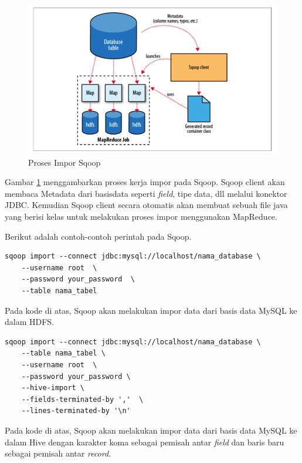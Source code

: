 \begin{figure}
	\centering
	\includegraphics[scale=0.5]{Gambar/sqoop-import.png}
	\caption[Proses Impor Sqoop]{Proses Impor Sqoop \cite{white2012hadoop}} 
	\label{fig:sqoop_import}
\end{figure}

Gambar \ref{fig:sqoop_import} menggambarkan proses kerja impor pada Sqoop. Sqoop client akan membaca Metadata dari basisdata seperti \textit{field}, tipe data, dll melalui konektor JDBC. Kemudian Sqoop client secara otomatis akan membuat sebuah file java yang berisi kelas untuk melakukan proses impor menggunakan MapReduce. 

Berikut adalah contoh-contoh perintah pada Sqoop.

\begin{lstlisting}[caption=Perintah Impor Sqoop dari Basis Data MySQL ke HDFS]
	sqoop import --connect jdbc:mysql://localhost/nama_database \
	--username root  \
	--password your_password  \
	--table nama_tabel 
\end{lstlisting}

Pada kode di atas, Sqoop akan melakukan impor data dari basis data MySQL ke dalam HDFS.

\begin{lstlisting}[caption=Perintah Impor Sqoop dari Basis Data MySQL ke Hive]
	sqoop import --connect jdbc:mysql://localhost/nama_database \
	--table nama_tabel \ 
	--username root  \
	--password your_password \
	--hive-import \
	--fields-terminated-by ','  \
	--lines-terminated-by '\n'
\end{lstlisting}

Pada kode di atas, Sqoop akan melakukan impor data dari basis data MySQL ke dalam Hive dengan karakter koma sebagai pemisah antar \textit{field} dan baris baru sebagai pemisah antar \textit{record}.

